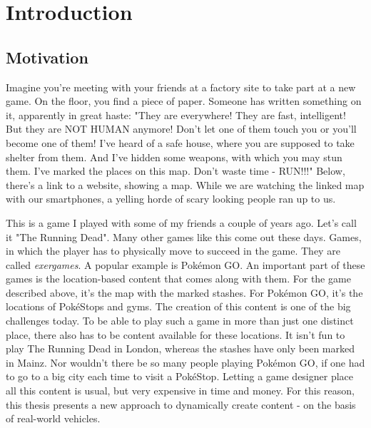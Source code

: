\chapter{Introduction}
\section{Motivation}
Imagine you're meeting with your friends at a factory site to take part at a new game. On the floor, you find a piece of paper. Someone has written something on it, apparently in great haste: "They are everywhere! They are fast, intelligent! But they are NOT HUMAN anymore! Don't let one of them touch you or you'll become one of them! I've heard of a safe house, where you are supposed to take shelter from them. And I've hidden some weapons, with which you may stun them. I've marked the places on this map. Don't waste time - RUN!!!" Below, there's a link to a website, showing a map. While we are watching the linked map with our smartphones, a yelling horde of scary looking people ran up to us.

This is a game I played with some of my friends a couple of years ago. Let's call it "The Running Dead". Many other games like this come out these days. Games, in which the player has to physically move to succeed in the game. They are called \emph{exergames}. A popular example is Pok\'{e}mon GO. An important part of these games is the location-based content that comes along with them. For the game described above, it's the map with the marked stashes. For Pok\'{e}mon GO, it's the locations of Pok\'{e}Stops and gyms. The creation of this content is one of the big challenges today. To be able to play such a game in more than just one distinct place, there also has to be content available for these locations. It isn't fun to play The Running Dead in London, whereas the stashes have only been marked in Mainz. Nor wouldn't there be so many people playing Pok\'{e}mon GO, if one had to go to a big city each time to visit a Pok\'{e}Stop. Letting a game designer place all this content is usual, but very expensive in time and money. For this reason, this thesis presents a new approach to dynamically create content - on the basis of real-world vehicles.

